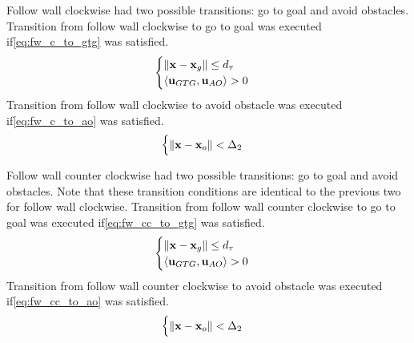 Follow wall clockwise had two possible transitions: go to goal and avoid obstacles.
Transition from follow wall clockwise to go to goal was executed if\:\eqref{eq:fw_c_to_gtg} was satisfied.
\begin{equation}
    \label{eq:fw_c_to_gtg}
    \begin{cases}
        \left\lVert \mathbf{x} - \mathbf{x}_g \right\rVert \le d_{\tau} \\
        \langle \mathbf{u}_{GTG} , \mathbf{u}_{AO} \rangle > 0
    \end{cases}
\end{equation}
Transition from follow wall clockwise to avoid obstacle was executed if\:\eqref{eq:fw_c_to_ao} was satisfied.
\begin{equation}
    \label{eq:fw_c_to_ao}
    \begin{cases}
        \left\lVert \mathbf{x} - \mathbf{x}_o \right\rVert < \Delta_2
    \end{cases}
\end{equation}

Follow wall counter clockwise had two possible transitions: go to goal and avoid obstacles. Note that these transition conditions are identical to the previous two for follow wall clockwise.
Transition from follow wall counter clockwise to go to goal was executed if\:\eqref{eq:fw_cc_to_gtg} was satisfied.
\begin{equation}
    \label{eq:fw_cc_to_gtg}
    \begin{cases}
        \left\lVert \mathbf{x} - \mathbf{x}_g \right\rVert \le d_{\tau} \\
        \langle \mathbf{u}_{GTG} , \mathbf{u}_{AO} \rangle > 0
    \end{cases}
\end{equation}
Transition from follow wall counter clockwise to avoid obstacle was executed if\:\eqref{eq:fw_cc_to_ao} was satisfied.
\begin{equation}
    \label{eq:fw_cc_to_ao}
    \begin{cases}
        \left\lVert \mathbf{x} - \mathbf{x}_o \right\rVert < \Delta_2
    \end{cases}
\end{equation}


